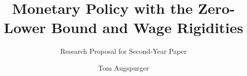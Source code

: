 \documentclass[12pt,a4paper]{scrartcl}            %
\begin{document}
\makeatletter
\def\blfootnote{\xdef\@thefnmark{}\@footnotetext}
\makeatother



\title{Monetary Policy with the Zero-Lower Bound and Wage Rigidities}
\subtitle{Research Proposal for Second-Year Paper}
\author{Tom Augspurger}                               %






\maketitle


\end{document}
